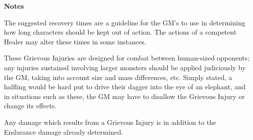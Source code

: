 \begin{multicols}{3}
\textbf{Notes}

The suggested recovery times are a guideline for the GM's to use in
determining how long characters should be kept out of action.  The
actions of a competent Healer may alter these times in some instances.

These Grievous Injuries are designed for combat between human-sized
opponents; any injuries sustained involving larger monsters should be
applied judiciously by the GM, taking into account size and mass
differences, etc.  Simply stated, a halfling would be hard put to
drive their dagger into the eye of an elephant, and in situations such
as these, the GM may have to disallow the Grievous Injury or change
its effects.

Any damage which results from a Grievous Injury is in addition to the
Endurance damage already determined.

\end{multicols}
